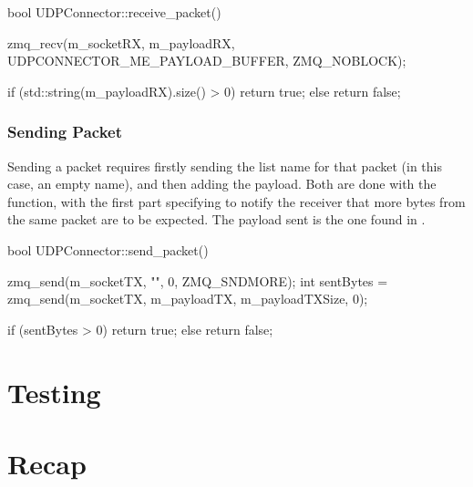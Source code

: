 \begin{codelist}{1}
bool UDPConnector::receive_packet() {
    zmq_recv(m_socketRX, m_payloadRX, UDPCONNECTOR_ME_PAYLOAD_BUFFER, ZMQ_NOBLOCK);

    if (std::string(m_payloadRX).size() > 0)
        return true;
    else
        return false;
}
\end{codelist}

\subsubsection{Sending Packet}

Sending a \gls{packet} requires firstly sending the list name for that \gls{packet} (in this case, an empty name), and then adding the \gls{payload}. Both are done with the  function, with the first part specifying  to notify the receiver that more bytes from the same \gls{packet} are to be expected. The \gls{payload} sent is the one found in .

\begin{codelist}{1}
bool UDPConnector::send_packet() {
	zmq_send(m_socketTX, "", 0, ZMQ_SNDMORE);
	int sentBytes = zmq_send(m_socketTX, m_payloadTX, m_payloadTXSize, 0);

	if (sentBytes > 0)
		return true;
	else
		return false;
}
\end{codelist}

\section{Testing}\label{sc:middleware:testing}

\section{Recap}\label{sc:middleware:recap}
